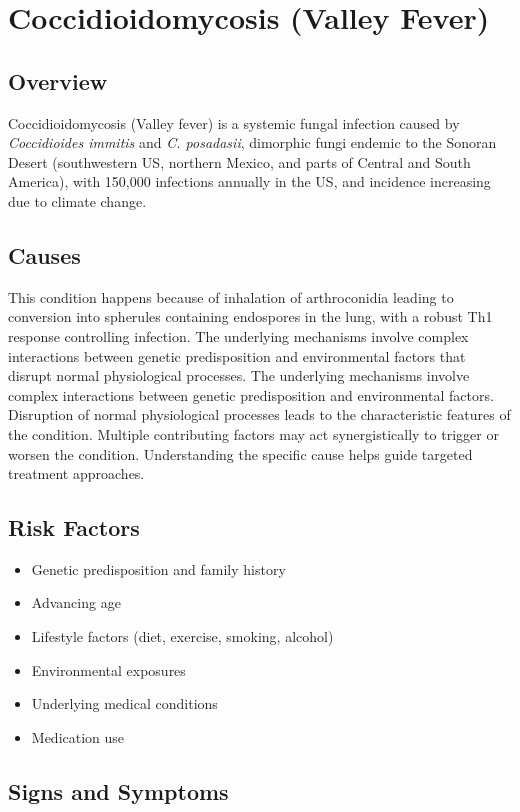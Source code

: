 \chapter{Coccidioidomycosis (Valley Fever)}
\label{sec:Coccidioidomycosis}

\section{Overview}
Coccidioidomycosis (Valley fever) is a systemic fungal infection caused by \textit{Coccidioides immitis} and \textit{C. posadasii}, dimorphic fungi endemic to the Sonoran Desert (southwestern US, northern Mexico, and parts of Central and South America), with 150,000 infections annually in the US, and incidence increasing due to climate change.
\section{Causes}
This condition happens because of inhalation of arthroconidia leading to conversion into spherules containing endospores in the lung, with a robust Th1 response controlling infection. The underlying mechanisms involve complex interactions between genetic predisposition and environmental factors that disrupt normal physiological processes. The underlying mechanisms involve complex interactions between genetic predisposition and environmental factors. Disruption of normal physiological processes leads to the characteristic features of the condition. Multiple contributing factors may act synergistically to trigger or worsen the condition. Understanding the specific cause helps guide targeted treatment approaches.
\section{Risk Factors}


\begin{itemize}[noitemsep]
  \item Genetic predisposition and family history
  \item Advancing age
  \item Lifestyle factors (diet, exercise, smoking, alcohol)
  \item Environmental exposures
  \item Underlying medical conditions
  \item Medication use
\end{itemize}
\section{Signs and Symptoms}


